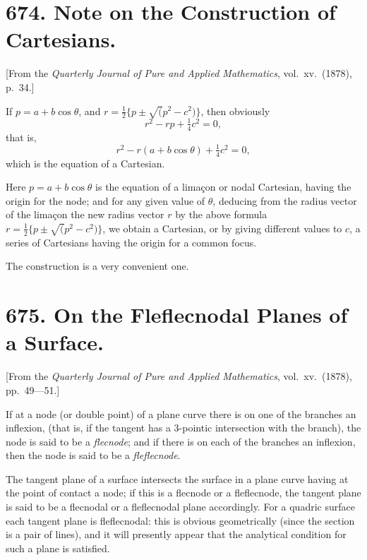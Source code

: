 \documentclass[11pt,a4paper]{book}
\begin{document}
\newpage

\section*{674. Note on the Construction of Cartesians.}

[From the \textit{Quarterly Journal of Pure and Applied Mathematics}, vol.\ xv.\ (1878), p.\ 34.]

If $p = a + b \cos \theta$, and $r = \frac{1}{2}\{p \pm \surd(p^2 - c^2)\}$, then obviously
\[
r^2 - rp + \tfrac{1}{4}c^2 = 0,
\]
that is,
\[
r^2 - r(a + b \cos \theta) + \tfrac{1}{4}c^2 = 0,
\]
which is the equation of a Cartesian.

Here $p = a + b \cos \theta$ is the equation of a lima\c{c}on or nodal Cartesian, having the origin for the node; and for any given value of $\theta$, deducing from the radius vector of the lima\c{c}on the new radius vector $r$ by the above formula $r = \frac{1}{2}\{p \pm \surd(p^2 - c^2)\}$, we obtain a Cartesian, or by giving different values to $c$, a series of Cartesians having the origin for a common focus.

The construction is a very convenient one.

\newpage

\section*{675. On the Fleflecnodal Planes of a Surface.}

[From the \textit{Quarterly Journal of Pure and Applied Mathematics}, vol.\ xv.\ (1878), pp.\ 49---51.]

If at a node (or double point) of a plane curve there is on one of the branches an inflexion, (that is, if the tangent has a 3-pointic intersection with the branch), the node is said to be a \textit{flecnode}; and if there is on each of the branches an inflexion, then the node is said to be a \textit{fleflecnode}.

The tangent plane of a surface intersects the surface in a plane curve having at the point of contact a node; if this is a flecnode or a fleflecnode, the tangent plane is said to be a flecnodal or a fleflecnodal plane accordingly. For a quadric surface each tangent plane is fleflecnodal: this is obvious geometrically (since the section is a pair of lines), and it will presently appear that the analytical condition for such a plane is satisfied.
\end{document}
